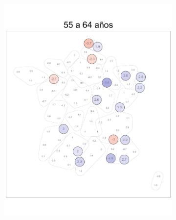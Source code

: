 \begin{figure}
\begin{subfigure}{0.3\textwidth}
	\includegraphics[width = \textwidth]{Figs/Efectos/Dorling_Efectos_Ed5_Modelo_H}
	\end{subfigure}
	~
	\begin{subfigure}{0.3\textwidth}

\end{subfigure}
\end{figure}
